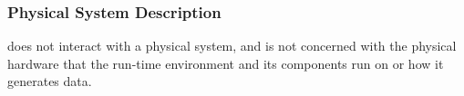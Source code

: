 \subsubsection{Physical System Description}
\progname{} does not interact with a physical system, and is not concerned with
the physical hardware that the run-time environment and its components run on
or how it generates data.